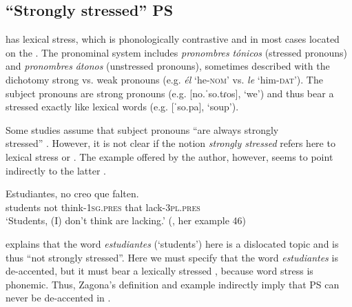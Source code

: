 \documentclass[output=paper]{langsci/langscibook}
\begin{document}
\subsection{``Strongly stressed'' PS}
\label{sec:pes:2.1}
 has lexical stress, which is phonologically contrastive and in most cases located on the . The  pronominal system includes \textit{pronombres} \textit{tónicos} (stressed pronouns) and \textit{pronombres} \textit{átonos} (unstressed pronouns), sometimes described with the dichotomy strong vs. weak pronouns (e.g. \textit{él} ‘he-\textsc{nom}’ vs. \textit{le} ‘him-\textsc{dat}’). The  subject pronouns are strong pronouns (e.g. [no.ˈso.tɾos], ‘we’) and thus bear a stressed  exactly like lexical words (e.g. [ˈso.pa], ‘soup’).

Some studies assume that  subject pronouns ``are always strongly \\ stressed'' \citep[25]{Zagona2002}. However, it is not clear if the notion \textit{strongly stressed} refers here to lexical stress or . The example offered by the author, however, seems to point indirectly to the latter .


\ea\label{ex:pes:2}
\gll Estudiantes,   no   creo       que  falten.\\
       students    not  think-\textsc{1sg}.\textsc{pres} that   lack-\textsc{3pl}.\textsc{pres}\\
\glt ‘Students, (I) don’t think are lacking.’     (\citealt[22]{Zagona2002}, her example 46)
\z

\citet[22]{Zagona2002} explains that the word \textit{estudiantes} (‘students’) here is a dislocated topic and is thus ``not strongly stressed''. Here we must specify that the word \textit{estudiantes} is de-accented, but it must bear a lexically stressed , because  word stress is phonemic. Thus, Zagona’s definition and example indirectly imply that PS can never be de-accented in .
\end{document}
